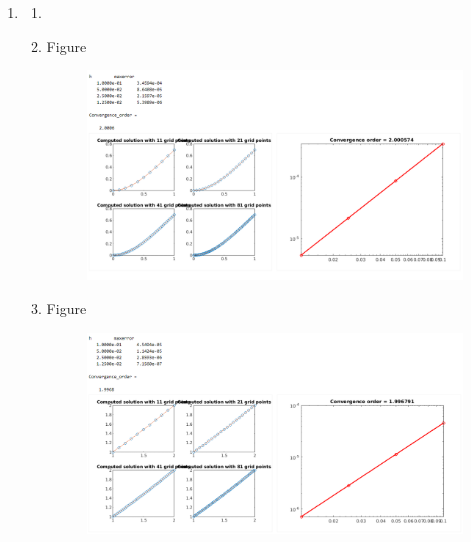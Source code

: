 \documentclass{article}
\begin{document}

\begin{enumerate}

\item 
	\begin{enumerate}
	\item
	\item Figure
	\begin{figure}[H]
	\includegraphics[scale=.5]{1b.PNG}
	\end{figure}
	\item Figure
	\begin{figure}[H]
	\includegraphics[scale=.5]{1c.PNG}
	\end{figure}
	\end{enumerate}


\end{enumerate}
\end{document}
